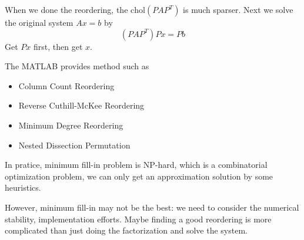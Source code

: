 When we done the reordering, the $\text{chol}(PAP^T)$ is much sparser. Next we solve the original system $Ax = b$ by \[
    (PAP^T)Px = Pb
\]
Get $Px$ first, then get $x$.

The MATLAB provides method such as \begin{itemize}
    \item Column Count Reordering
    \item Reverse Cuthill-McKee Reordering
    \item Minimum Degree Reordering
    \item Nested Dissection Permutation
\end{itemize}

\begin{remark}
    In pratice, minimum fill-in problem is NP-hard, which is a combinatorial optimization problem, we can only get an approximation solution by some heuristics.
\end{remark}

However, minimum fill-in may not be the best: we need to consider the numerical stability, implementation efforts. Maybe finding a good reordering is more complicated than just doing the factorization and solve the system.
